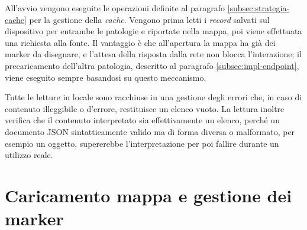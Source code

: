 
All'avvio vengono eseguite le operazioni definite al paragrafo \ref{subsec:strategia-cache} per la gestione della \textit{cache}.
Vengono prima letti i \textit{record} salvati sul dispositivo per entrambe le patologie e riportate nella mappa,
poi viene effettuata una richiesta alla fonte.
Il vantaggio è che all'apertura la mappa ha già dei marker da disegnare, e l'attesa della risposta dalla rete non blocca
l'interazione; il precaricamento dell'altra patologia, descritto al paragrafo \ref{subsec:impl-endpoint}, viene eseguito
sempre basandosi su questo meccanismo.


Tutte le letture in locale sono racchiuse in una gestione degli errori che, in caso di contenuto illeggibile o d'errore, restituisce un elenco vuoto.
La lettura inoltre verifica che il contenuto interpretato sia effettivamente un elenco, perché un documento JSON sintatticamente
valido ma di forma diversa o malformato, per esempio un oggetto, supererebbe l'interpretazione per poi fallire durante un utilizzo reale.

\section{Caricamento mappa e gestione dei marker}\label{sec:impl-mappe}

